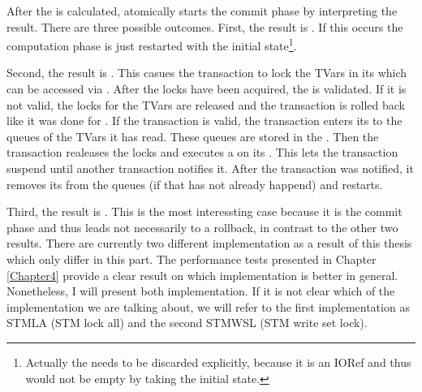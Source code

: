 After the  is calculated, atomically starts the commit phase by interpreting
the result. There are three possible outcomes.
First, the result is . If this occurs the computation phase is just restarted 
with the initial state\footnote{Actually the  needs to be discarded explicitly,
because it is an IORef and thus would not be empty by taking the initial state.}. 

Second, the result is . This casues the transaction to lock the TVars in its 
 which can be accessed via . After the locks have been acquired, 
the  is validated. If it is not valid, the locks for the TVars are released and
the transaction is rolled back like it was done for . If the transaction is 
valid, the transaction enters its  to the queues of the TVars it has read.
These queues are stored in the . Then the transaction realeases the locks and 
executes a  on its . This lets the transaction suspend until
another transaction notifies it. After the transaction was notified, it removes its 
 from the queues (if that has not already happend) and restarts.

Third, the result is . This is the most interessting case
because it is the commit phase and thus leads not necessarily to a rollback, in contrast to 
the other two results. 
There are currently two different implementation as a result of this thesis which 
only differ in this part. The performance tests presented in Chapter \ref{Chapter4} 
provide a clear result on which implementation is better in general. Nonetheless, I will present
both implementation. If it is not clear which of the implementation we are talking about,
we will refer to the first implementation as STMLA (STM lock all) and the second STMWSL 
(STM write set lock). 

